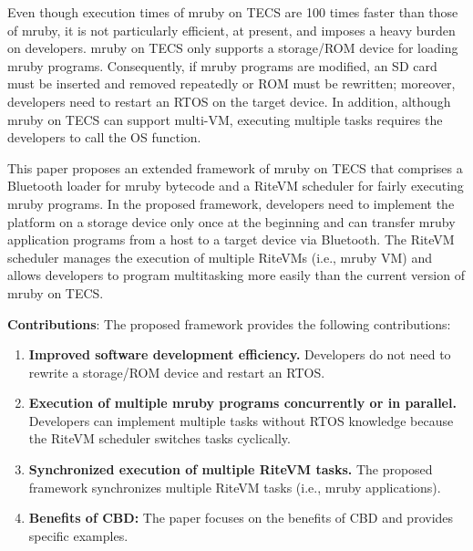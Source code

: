 \documentclass[conference]{IEEEtran/IEEEtran/IEEEtran}
\begin{document}
Even though execution times of mruby on TECS are 100 times faster than those of mruby, it is not particularly efficient, at present, and imposes a heavy burden on developers.
mruby on TECS only supports a storage/ROM device for loading mruby programs.
Consequently, if mruby programs are modified, an SD card must be inserted and removed repeatedly or ROM must be rewritten; moreover, developers need to restart an RTOS on the target device.
In addition, although mruby on TECS can support multi-VM, executing multiple tasks requires the developers to call the OS function.

This paper proposes an extended framework of mruby on TECS that comprises a Bluetooth loader for mruby bytecode and a RiteVM scheduler for fairly executing mruby programs.
In the proposed framework, developers need to implement the platform on a storage device only once at the beginning and can transfer mruby application programs from a host to a target device via Bluetooth.
The RiteVM scheduler manages the execution of multiple RiteVMs (i.e., mruby VM) and allows developers to program multitasking more easily than the current version of mruby on TECS.

{\bf Contributions}: The proposed framework provides the following contributions:
\begin{enumerate}
    \vspace{-2mm}
\item {\bf Improved software development efficiency.}
Developers do not need to rewrite a storage/ROM device and restart an RTOS.
\item {\bf Execution of multiple mruby programs concurrently or in parallel.}
Developers can implement multiple tasks without RTOS knowledge because the RiteVM scheduler switches tasks cyclically.
\item {\bf Synchronized execution of multiple RiteVM tasks.}
The proposed framework synchronizes multiple RiteVM tasks (i.e., mruby applications).
\item {\bf Benefits of CBD:}
The paper focuses on the benefits of CBD and provides specific examples.
    \vspace{-2mm}
\end{enumerate}
\end{document}
